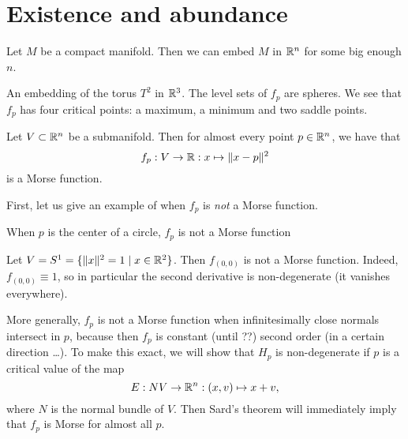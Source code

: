 \section{Existence and abundance}

Let $M$ be a compact manifold.
Then we can embed $M$ in $\mathbb{R}^{n}$ for some big enough $n$.

\begin{marginfigure}
    \centering
    \caption{An embedding of the torus $T^2$ in $\mathbb{R}^3$. The level sets of $f_p$ are spheres. We see that $f_p$ has four critical points: a maximum, a minimum and two saddle points.}
    \label{fig:level-sets-of-distance-function-torus}
\end{marginfigure}

\begin{prop}
    Let $V \subset \mathbb{R}^{n}$ be a submanifold.
    Then for almost every point $p \in \mathbb{R}^{n}$, we have that
    \[
    f_p : V \to \mathbb{R}: x \mapsto  \|x - p\|^2
    \] 
    is a Morse function.
\end{prop}

First, let us give an example of when $f_p$ is \emph{not} a Morse function.

\begin{marginfigure}
    \centering
    \caption{When $p$ is the center of a circle, $f_p$ is not a Morse function}
    \label{fig:example-when-fp-is-not-a-morse-function}
\end{marginfigure}
\begin{eg}
    Let $V = S^1 = \{\|x\|^2 = 1  \mid  x \in \mathbb{R}^2\} $.
    Then $f_{(0, 0)}$ is not a Morse function.
    Indeed, $f_{(0, 0)} \equiv 1$, so in particular the second derivative is non-degenerate (it vanishes everywhere).
\end{eg}


More generally, $f_p$ is not a Morse function when infinitesimally close normals intersect in $p$, because then $f_p$ is constant (until ??) second order (in a certain direction \ldots ).
To make this exact, we will show that $H_p$ is non-degenerate if $p$ is a critical value of the map
\[
    E: NV \to  \mathbb{R}^{n}: (x, v) \mapsto x + v
,\]
where $N$ is the normal bundle of $V$.
Then Sard's theorem will immediately imply that $f_p$ is Morse for almost all $p$.

\begin{figure}[H]
    \centering
    \label{fig:existence-of-morse-functions-normal-bundle-map}
\end{figure}

